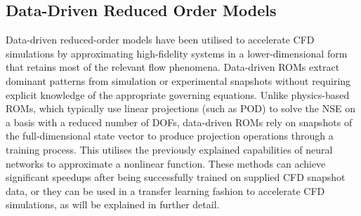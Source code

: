 

\subsection{Data-Driven Reduced Order Models}
\label{subsect: data driven ROMS}
 Data-driven reduced-order models have been utilised to accelerate CFD simulations by approximating high-fidelity systems in a lower-dimensional form that retains most of the relevant flow phenomena. Data-driven ROMs extract dominant patterns from simulation or experimental snapshots without requiring explicit knowledge of the appropriate governing equations. Unlike physics-based ROMs, which typically use linear projections (such as POD) to solve the NSE on a basis with a reduced number of DOFs, data-driven ROMs rely on snapshots of the full-dimensional state vector to produce projection operations through a training process. This utilises the previously explained capabilities of neural networks to approximate a nonlinear function. These methods can achieve significant speedups after being successfully trained on supplied CFD snapshot data, or they can be used in a transfer learning fashion to accelerate CFD simulations, as will be explained in further detail. 

